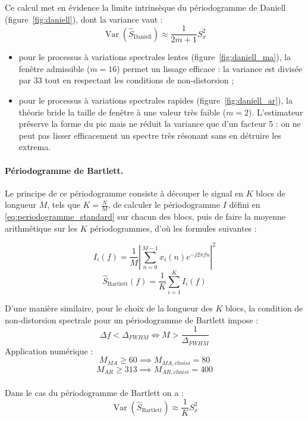 \documentclass[11pt,a4paper]{article}
\begin{document}
Ce calcul met en évidence la limite intrinsèque du périodogramme de Daniell (figure~\ref{fig:daniell}), dont la variance vaut :
\begin{equation}
    \operatorname{Var}(\hat{S}_{\text{Daniell}}) \approx \frac{1}{2m+1} S_x^2
\end{equation}
\begin{itemize}
    \item pour le processus à variations spectrales lentes (figure~\ref{fig:daniell_ma}), la fenêtre admissible ($m = 16$) permet un lissage efficace : la variance est divisée par 33 tout en respectant les conditions de non-distorsion ;
    \item pour le processus à variations spectrales rapides (figure~\ref{fig:daniell_ar}), la théorie bride la taille de fenêtre à une valeur très faible ($m = 2$). L'estimateur préserve la forme du pic mais ne réduit la variance que d'un facteur 5 : on ne peut pas lisser efficacement un spectre très résonant sans en détruire les extrema.
\end{itemize}

\paragraph{Périodogramme de Bartlett.} Le principe de ce périodogramme consiste à découper le signal en $K$ blocs de longueur $M$, tels que $K = \frac{N}{M}$, de calculer le périodogramme $I$ défini en \eqref{eq:periodogramme_standard} sur chacun des blocs, puis de faire la moyenne arithmétique sur les $K$ périodogrammes, d'où les formules suivantes :

\begin{equation}
    I_i(f) = \frac{1}{M} \left| \sum_{n=0}^{M-1} x_i(n) e^{-j 2 \pi f n} \right|^2
\end{equation}
\begin{equation}
    \hat{S}_{\text{Bartlett}}(f) = \frac{1}{K} \sum_{i=1}^{K} I_i(f)
\end{equation}

D'une manière similaire, pour le choix de la longueur des $K$ blocs, la condition de non-distorsion spectrale pour un périodogramme de Bartlett impose :
\begin{equation}
    \Delta f < {\Delta}_{FWHM}
    \iff M > \frac{1}{{\Delta}_{FWHM}}
\end{equation}
Application numérique :
\begin{equation}
    M_{MA} \ge 60 \implies M_{MA,choisi} = 80
\end{equation}
\begin{equation}
    M_{AR} \ge 313 \implies M_{AR, choisi} = 400
\end{equation}
\\
Dans le cas du périodogramme de Bartlett on a :
\begin{equation}
    \operatorname{Var}(\hat{S}_{\text{Bartlett}}) \approx \frac{1}{K} S_x^2
\end{equation}
\end{document}
